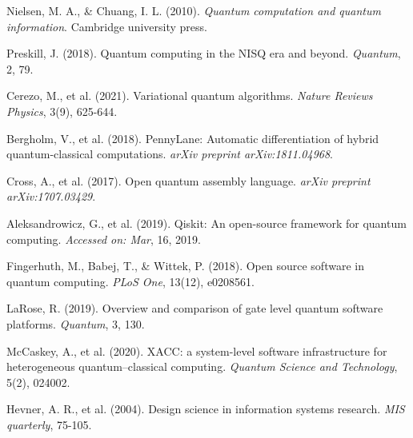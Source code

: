 \documentclass[12pt,a4paper]{article}
\begin{document}
\begin{thebibliography}{99}

Nielsen, M. A., \& Chuang, I. L. (2010). \textit{Quantum computation and quantum information}. Cambridge university press.

Preskill, J. (2018). Quantum computing in the NISQ era and beyond. \textit{Quantum}, 2, 79.

Cerezo, M., et al. (2021). Variational quantum algorithms. \textit{Nature Reviews Physics}, 3(9), 625-644.

Bergholm, V., et al. (2018). PennyLane: Automatic differentiation of hybrid quantum-classical computations. \textit{arXiv preprint arXiv:1811.04968}.

Cross, A., et al. (2017). Open quantum assembly language. \textit{arXiv preprint arXiv:1707.03429}.

Aleksandrowicz, G., et al. (2019). Qiskit: An open-source framework for quantum computing. \textit{Accessed on: Mar}, 16, 2019.

Fingerhuth, M., Babej, T., \& Wittek, P. (2018). Open source software in quantum computing. \textit{PLoS One}, 13(12), e0208561.

LaRose, R. (2019). Overview and comparison of gate level quantum software platforms. \textit{Quantum}, 3, 130.

McCaskey, A., et al. (2020). XACC: a system-level software infrastructure for heterogeneous quantum–classical computing. \textit{Quantum Science and Technology}, 5(2), 024002.

Hevner, A. R., et al. (2004). Design science in information systems research. \textit{MIS quarterly}, 75-105.

\end{thebibliography}
\end{document}
